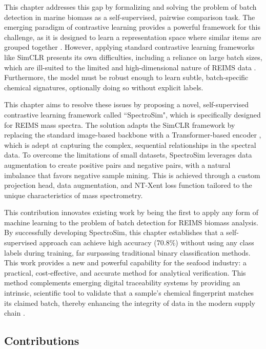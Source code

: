 This chapter addresses this gap by formalizing and solving the problem of batch detection in marine biomass as a self-supervised, pairwise comparison task. The emerging paradigm of contrastive learning provides a powerful framework for this challenge, as it is designed to learn a representation space where similar items are grouped together \citep{Bromley1993}. However, applying standard contrastive learning frameworks like SimCLR presents its own difficulties, including a reliance on large batch sizes, which are ill-suited to the limited and high-dimensional nature of REIMS data \citep{Chen2020a,Kinakh2021}. Furthermore, the model must be robust enough to learn subtle, batch-specific chemical signatures, optionally doing so without explicit labels.

This chapter aims to resolve these issues by proposing a novel, self-supervised contrastive learning framework called ``SpectroSim", which is specifically designed for REIMS mass spectra. The solution adapts the SimCLR framework \citep{Chen2020a} by replacing the standard image-based backbone with a Transformer-based encoder \citep{Vaswani2017}, which is adept at capturing the complex, sequential relationships in the spectral data. To overcome the limitations of small datasets, SpectroSim leverages data augmentation to create positive pairs and negative pairs, with a natural imbalance that favors negative sample mining. This is achieved through a custom projection head, data augmentation, and NT-Xent loss function tailored to the unique characteristics of mass spectrometry.

This contribution innovates existing work by being the first to apply any form of machine learning to the problem of batch detection for REIMS biomass analysis. By successfully developing SpectroSim, this chapter establishes that a self-supervised approach can achieve high accuracy (70.8\%) without using any class labels during training, far surpassing traditional binary classification methods. This work provides a new and powerful capability for the seafood industry: a practical, cost-effective, and accurate method for analytical verification. This method complements emerging digital traceability systems \citep{turkson2025digital, dahariya2025enhancing} by providing an intrinsic, scientific tool to validate that a sample's chemical fingerprint matches its claimed batch, thereby enhancing the integrity of data in the modern supply chain \citep{Piroutkova2025}.

\subsection{Contributions}

